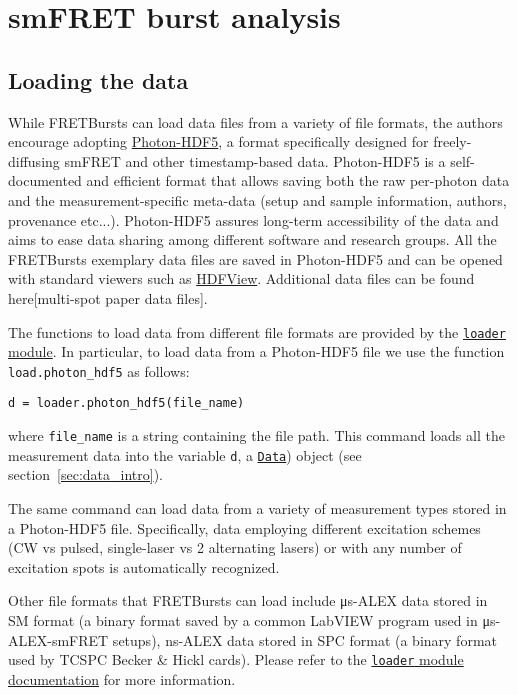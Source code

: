 \section{smFRET burst analysis}
\label{sec:analysis}

\subsection{Loading the data}
\label{sec:dataload}

While FRETBursts can load data files from a variety of file formats,
the authors encourage adopting \href{http://photon-hdf5.readthedocs.org/}{Photon-HDF5},
a format specifically designed for freely-diffusing smFRET and other timestamp-based data. 
Photon-HDF5 is a self-documented and efficient format
that allows saving both the raw per-photon data and the measurement-specific meta-data
(setup and sample information, authors, provenance etc...).
Photon-HDF5 assures long-term accessibility of the data and aims to ease data sharing 
among different software and research groups.
All the FRETBursts exemplary data files are saved in Photon-HDF5 and can be opened with 
standard viewers such as \href{http://www.hdfgroup.org/products/java/hdfview/}{HDFView}. 
Additional data files can be found here[multi-spot paper data files].

The functions to load data from different file formats are provided by
the \href{http://fretbursts.readthedocs.org/en/latest/loader.html}{\texttt{loader} module}.
In particular, to load data from a Photon-HDF5 file we use the function
\verb|load.photon_hdf5| as follows:

\begin{verbatim}
d = loader.photon_hdf5(file_name)
\end{verbatim}

where \verb|file_name| is a string containing the file path. 
This command loads all the measurement data into the variable \verb|d|,
a \href{http://fretbursts.readthedocs.org/en/latest/data_class.html}{\texttt{Data}}) object 
(see section~\ref{sec:data_intro}).

The same command can load data from a variety of measurement types stored 
in a Photon-HDF5 file. Specifically, data employing different excitation schemes 
(CW vs pulsed, single-laser vs 2 alternating lasers) or with any number of excitation spots
is automatically recognized.

Other file formats that FRETBursts can load include μs-ALEX data stored in SM format
(a binary format saved by a common LabVIEW program used in μs-ALEX-smFRET setups), 
ns-ALEX data stored in SPC format (a binary format used by TCSPC Becker \& Hickl cards).
Please refer to the 
\href{http://fretbursts.readthedocs.org/en/latest/loader.html}{\texttt{loader} module documentation} 
for more information.

